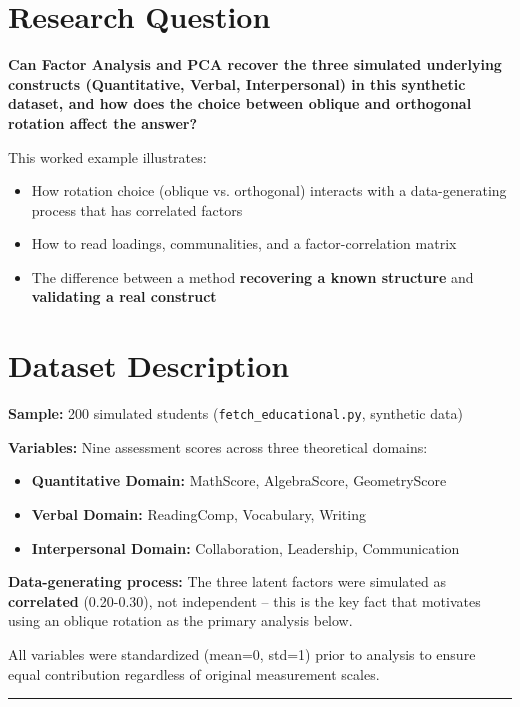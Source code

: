 \documentclass[
]{article}
\begin{document}
\section{Research Question}

\textbf{Can Factor Analysis and PCA recover the three simulated
underlying constructs (Quantitative, Verbal, Interpersonal) in this
synthetic dataset, and how does the choice between oblique and
orthogonal rotation affect the answer?}

This worked example illustrates:

\begin{itemize}
\item
  How rotation choice (oblique vs. orthogonal) interacts with a
  data-generating process that has correlated factors
\item
  How to read loadings, communalities, and a factor-correlation matrix
\item
  The difference between a method \textbf{recovering a known structure}
  and \textbf{validating a real construct}
\end{itemize}

\section{Dataset Description}

\textbf{Sample:} 200 simulated students (\texttt{fetch\_educational.py},
synthetic data)

\textbf{Variables:} Nine assessment scores across three theoretical
domains:

\begin{itemize}
\item
  \textbf{Quantitative Domain:} MathScore, AlgebraScore, GeometryScore
\item
  \textbf{Verbal Domain:} ReadingComp, Vocabulary, Writing
\item
  \textbf{Interpersonal Domain:} Collaboration, Leadership,
  Communication
\end{itemize}

\textbf{Data-generating process:} The three latent factors were
simulated as \textbf{correlated} (0.20-0.30), not independent -- this is
the key fact that motivates using an oblique rotation as the primary
analysis below.

All variables were standardized (mean=0, std=1) prior to analysis to
ensure equal contribution regardless of original measurement scales.

\begin{center}\rule{0.5\linewidth}{0.5pt}\end{center}
\end{document}
